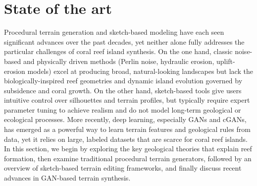 





\section{State of the art}
\label{sec:coral-island_SotA}

Procedural terrain generation and sketch-based modeling have each seen significant advances over the past decades, yet neither alone fully addresses the particular challenges of coral reef island synthesis. On the one hand, classic noise-based and physically driven methods (Perlin noise, hydraulic erosion, uplift-erosion models) excel at producing broad, natural-looking landscapes but lack the biologically-inspired reef geometries and dynamic island evolution governed by subsidence and coral growth. On the other hand, sketch-based tools give users intuitive control over silhouettes and terrain profiles, but typically require expert parameter tuning to achieve realism and do not model long-term geological or ecological processes. More recently, deep learning, especially GANs and cGANs, has emerged as a powerful way to learn terrain features and geological rules from data, yet it relies on large, labeled datasets that are scarce for coral reef islands. In this section, we begin by exploring the key geological theories that explain reef formation, then examine traditional procedural terrain generators, followed by an overview of sketch-based terrain editing frameworks, and finally discuss recent advances in GAN-based terrain synthesis.


